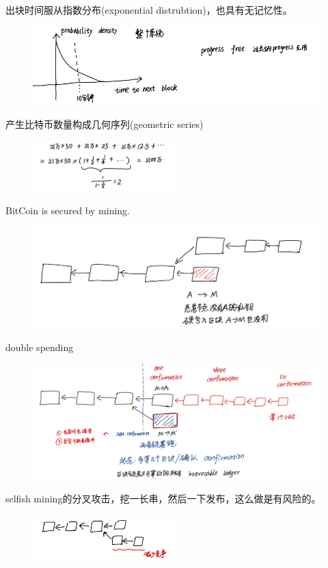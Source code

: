 \documentclass[10pt]{ctexart}
\begin{document}
出块时间服从指数分布(exponential distrubtion)，也具有无记忆性。
\begin{figure}[H]
    \centering
    \includegraphics[width=1\textwidth]{./lecture5/img3.png} 
\end{figure}
产生比特币数量构成几何序列(geometric series)
\begin{figure}[H]
    \centering
    \includegraphics[width=0.5\textwidth]{./lecture5/img4.png} 
\end{figure}
BitCoin is secured by mining.
\begin{figure}[H]
    \centering
    \includegraphics[width=1\textwidth]{./lecture5/img5.png} 
\end{figure}
double spending
\begin{figure}[H]
    \centering
    \includegraphics[width=1\textwidth]{./lecture5/img6.png} 
\end{figure}
selfish mining的分叉攻击，挖一长串，然后一下发布，这么做是有风险的。
\begin{figure}[H]
    \centering
    \includegraphics[width=0.5\textwidth]{./lecture5/img7.png} 
\end{figure}
\end{document}
